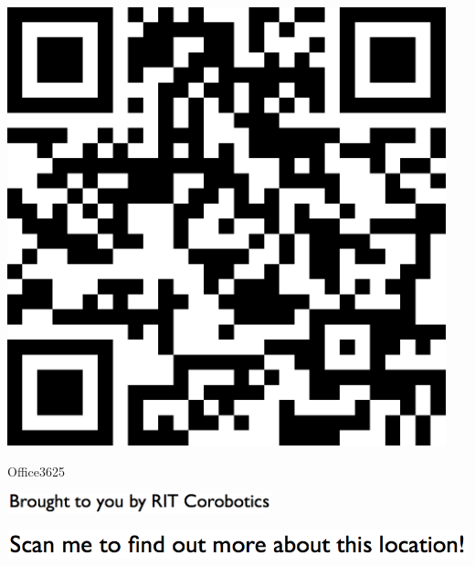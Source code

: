 \documentclass[letterpaper]{article}
\begin{document}
 \begingroup 
 \centerline{\includegraphics[scale=1,width=5in,height=5in]{Office3625.png}} 
 \endgroup 
 \vspace*{\fill} 

 \hfill{\small Office3625} 

  \vspace{0.7in} 
 
 \centerline{\includegraphics[scale=1,width=3in]{text-bottom.png}} 
 
 \pagebreak 
{} 
 \vspace*{\fill} 
 
  \centerline{\includegraphics[scale=1,width=6in]{text-top.png}} 
 
 \vspace{0.5in} 
 
\end{document}
